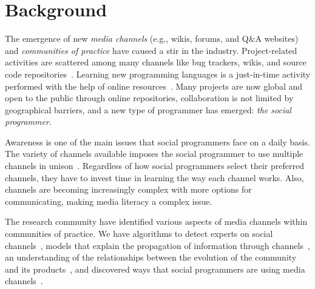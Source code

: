\section{Background}
\label{cha:background}


    The emergence of new \textit{media channels} (e.g., wikis, forums, and Q\&A websites) and \textit{communities of practice} have caused a stir in the industry.
    Project-related activities are scattered among many channels like bug trackers, wikis, and source code repositories~\cite{Guzzi2013}.
    Learning new programming languages is a just-in-time activity performed with the help of online resources~\cite{Sim2013,Storey2010,Hartmann2008}.
    Many projects are now global and open to the public through online repositories, collaboration is not limited by geographical barriers, and a new type of programmer has emerged: \textit{the social programmer}.

    Awareness is one of the main issues that social programmers face on a daily basis.
    The variety of channels available imposes the social programmer to use multiple channels in unison~\cite{Storey2010, Storey2014}.
    Regardless of how social programmers select their preferred channels, they have to invest time in learning the way each channel works.
    Also, channels are becoming increasingly complex with more options for communicating, making media literacy a complex issue.

    The research community have identified various aspects of media channels within communities of practice.
    We have algorithms to detect experts on social channels~\cite{Pal2011a,Pal2012a}, models that explain the propagation of information through channels~\cite{Jin2013, Jiang2013}, an understanding of the relationships between the evolution of the community and its products~\cite{German2013}, and discovered ways that social programmers are using media channels~\cite{Sowe2008a, Singh2009, Parnin2013}.

